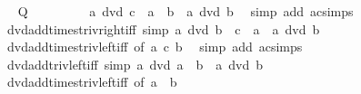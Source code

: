 \begin{isabellebody}
\ \isamarkupfalse%
\ {\isacharquery}{\kern0pt}Q\ \isacommand{{\isachardot}{\kern0pt}{\isachardot}{\kern0pt}}\isamarkupfalse%
\isanewline
\ \ \isamarkupfalse%
\isanewline
\ \ \isamarkupfalse%
\ \isamarkupfalse%
\ {\isachardoublequoteopen}a\ dvd\ c\ {\isacharasterisk}{\kern0pt}\ a\ {\isacharplus}{\kern0pt}\ b\ {\isasymlongleftrightarrow}\ a\ dvd\ b{\isachardoublequoteclose}\ \isamarkupfalse%
\ {\isacharparenleft}{\kern0pt}simp\ add{\isacharcolon}{\kern0pt}\ ac{\isacharunderscore}{\kern0pt}simps{\isacharparenright}{\kern0pt}\isanewline
{}\isamarkupfalse%
%
\endisatagproof
{\isafoldproof}%
%
\isadelimproof
\isanewline
%
\endisadelimproof
\isanewline
{}\isamarkupfalse%
\ dvd{\isacharunderscore}{\kern0pt}add{\isacharunderscore}{\kern0pt}times{\isacharunderscore}{\kern0pt}triv{\isacharunderscore}{\kern0pt}right{\isacharunderscore}{\kern0pt}iff\ {\isacharbrackleft}{\kern0pt}simp{\isacharbrackright}{\kern0pt}{\isacharcolon}{\kern0pt}\ {\isachardoublequoteopen}a\ dvd\ b\ {\isacharplus}{\kern0pt}\ c\ {\isacharasterisk}{\kern0pt}\ a\ {\isasymlongleftrightarrow}\ a\ dvd\ b{\isachardoublequoteclose}\isanewline
%
\isadelimproof
\ \ %
\endisadelimproof
%
\isatagproof
{}\isamarkupfalse%
\ dvd{\isacharunderscore}{\kern0pt}add{\isacharunderscore}{\kern0pt}times{\isacharunderscore}{\kern0pt}triv{\isacharunderscore}{\kern0pt}left{\isacharunderscore}{\kern0pt}iff\ {\isacharbrackleft}{\kern0pt}of\ a\ c\ b{\isacharbrackright}{\kern0pt}\ \isamarkupfalse%
\ {\isacharparenleft}{\kern0pt}simp\ add{\isacharcolon}{\kern0pt}\ ac{\isacharunderscore}{\kern0pt}simps{\isacharparenright}{\kern0pt}%
\endisatagproof
{\isafoldproof}%
%
\isadelimproof
\isanewline
%
\endisadelimproof
\isanewline
{}\isamarkupfalse%
\ dvd{\isacharunderscore}{\kern0pt}add{\isacharunderscore}{\kern0pt}triv{\isacharunderscore}{\kern0pt}left{\isacharunderscore}{\kern0pt}iff\ {\isacharbrackleft}{\kern0pt}simp{\isacharbrackright}{\kern0pt}{\isacharcolon}{\kern0pt}\ {\isachardoublequoteopen}a\ dvd\ a\ {\isacharplus}{\kern0pt}\ b\ {\isasymlongleftrightarrow}\ a\ dvd\ b{\isachardoublequoteclose}\isanewline
%
\isadelimproof
\ \ %
\endisadelimproof
%
\isatagproof
{}\isamarkupfalse%
\ dvd{\isacharunderscore}{\kern0pt}add{\isacharunderscore}{\kern0pt}times{\isacharunderscore}{\kern0pt}triv{\isacharunderscore}{\kern0pt}left{\isacharunderscore}{\kern0pt}iff\ {\isacharbrackleft}{\kern0pt}of\ a\ {}\ b{\isacharbrackright}{\kern0pt}\ \isamarkupfalse%

\end{isabellebody}
